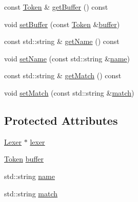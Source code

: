 \begin{DoxyCompactItemize}
\item 
const \mbox{\hyperlink{struct_token}{Token}} \& \mbox{\hyperlink{class_erable_1_1_compiler_1_1_token_element_aaa07b9e02310ab5efdd8307da32519a9}{get\+Buffer}} () const
\item 
void \mbox{\hyperlink{class_erable_1_1_compiler_1_1_token_element_a1f1ac4ad51ae96abf7b2fa38a71a5c95}{set\+Buffer}} (const \mbox{\hyperlink{struct_token}{Token}} \&\mbox{\hyperlink{class_erable_1_1_compiler_1_1_token_element_ad54dc8486a1df4b267b99acd69f344dc}{buffer}})
\item 
const std\+::string \& \mbox{\hyperlink{class_erable_1_1_compiler_1_1_token_element_aa8b8e5f0f68ab2d8a65a1dd84b298d5e}{get\+Name}} () const
\item 
void \mbox{\hyperlink{class_erable_1_1_compiler_1_1_token_element_ac0cb9e94c13b7e4affe4b9facf55995b}{set\+Name}} (const std\+::string \&\mbox{\hyperlink{class_erable_1_1_compiler_1_1_token_element_aeeb8454fbc160978c6fcb27b77ff9d90}{name}})
\item 
const std\+::string \& \mbox{\hyperlink{class_erable_1_1_compiler_1_1_token_element_ac46915762b64fc88255d05f64a09c3b3}{get\+Match}} () const
\item 
void \mbox{\hyperlink{class_erable_1_1_compiler_1_1_token_element_a75a286a395ab89b413273caaf86f04e5}{set\+Match}} (const std\+::string \&\mbox{\hyperlink{class_erable_1_1_compiler_1_1_token_element_acae3d5d6e860524271a0f164bbd25d83}{match}})
\end{DoxyCompactItemize}
\subsection*{Protected Attributes}
\begin{DoxyCompactItemize}
\item 
\mbox{\hyperlink{class_lexer}{Lexer}} $\ast$ \mbox{\hyperlink{class_erable_1_1_compiler_1_1_token_element_a81c49facfd93dd67f5afeb4bfe305e3a}{lexer}}
\item 
\mbox{\hyperlink{struct_token}{Token}} \mbox{\hyperlink{class_erable_1_1_compiler_1_1_token_element_ad54dc8486a1df4b267b99acd69f344dc}{buffer}}
\item 
std\+::string \mbox{\hyperlink{class_erable_1_1_compiler_1_1_token_element_aeeb8454fbc160978c6fcb27b77ff9d90}{name}}
\item 
std\+::string \mbox{\hyperlink{class_erable_1_1_compiler_1_1_token_element_acae3d5d6e860524271a0f164bbd25d83}{match}}
\end{DoxyCompactItemize}


